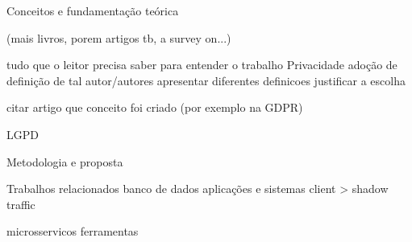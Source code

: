 

%



Conceitos e fundamentação teórica

(mais livros, porem artigos tb, a survey on...)


tudo que o leitor precisa saber para entender o trabalho
Privacidade
adoção de definição de tal autor/autores
apresentar diferentes definicoes
justificar a escolha

citar artigo que conceito foi criado (por exemplo na GDPR)

LGPD 


Metodologia e proposta

Trabalhos relacionados
banco de dados
aplicações e sistemas
    client > shadow traffic

microsservicos
ferramentas





%

%
